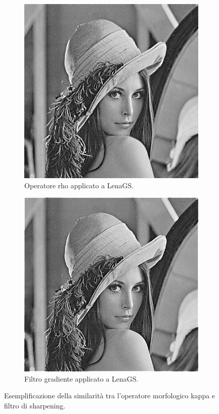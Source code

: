 \documentclass{subfiles}
\begin{document}
\begin{figure}[!h]
    \centering
    \begin{subfigure}[b]{0.4\textwidth}
        \centering
        \includegraphics[scale = 0.3]{../Images/Lena/Lena con operatore kappa.png}
        \caption{Operatore rho applicato a LenaGS.}
    \end{subfigure}
    \hspace{10pt}
    \begin{subfigure}[b]{0.4\textwidth}
        \centering
        \includegraphics[scale = 0.3]{../Images/Lena/SharpnedLena.png}
        \caption{Filtro gradiente applicato a LenaGS.}
    \end{subfigure}
    \caption{Esemplificazione della similarità tra l'operatore morfologico kappa e filtro di sharpening.}
    \label{fig:7.3}
\end{figure}
\end{document}
